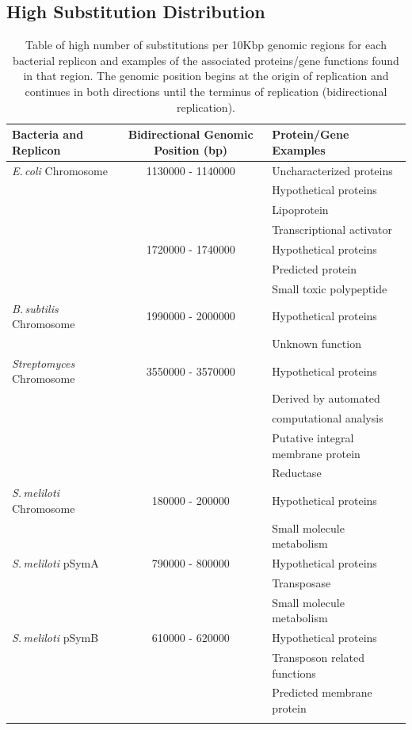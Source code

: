 \documentclass[11pt]{article}
\newcommand{\smel}{\textit{S.\,meliloti}\xspace}
\newcommand{\strep}{\textit{Streptomyces}\xspace}
\newcommand{\ecol}{\textit{E.\,coli}\xspace}
\newcommand{\bass}{\textit{B.\,subtilis}\xspace}
\newcommand{\pa}{pSymA\xspace}
\newcommand{\pb}{pSymB\xspace}
\begin{document}
\subsection{High Substitution Distribution}
\begin{longtable}{lcl}
	\hline
	Bacteria and Replicon & Bidirectional Genomic Position (bp) & Protein/Gene Examples \\ \hline
	\ecol Chromosome & 1130000 - 1140000 & Uncharacterized proteins\\
	& & Hypothetical proteins\\
	& & Lipoprotein\\ 
	& & Transcriptional activator\\ 
	& 1720000 - 1740000 & Hypothetical proteins\\
	& & Predicted protein\\
	& & Small toxic polypeptide\\ \hline
	\bass Chromosome & 1990000 - 2000000 & Hypothetical proteins\\
	& & Unknown function\\ \hline
	\strep Chromosome & 3550000 - 3570000 & Hypothetical proteins\\
	& & Derived by automated\\
	&  & computational analysis\\
	& & Putative integral membrane protein\\
	& & Reductase \\ \hline
	\smel Chromosome & 180000 - 200000 & Hypothetical proteins\\
	& & Small molecule metabolism\\	\hline
	\smel \pa & 790000 - 800000 & Hypothetical proteins\\
	& & Transposase \\
	& & Small molecule metabolism \\ \hline
	\smel \pb & 610000 - 620000 & Hypothetical proteins\\
	& & Transposon related functions\\
	& & Predicted membrane protein\\ \hline
	\caption{\label{tab:high_sub_bars} Table of high number of substitutions per 10Kbp genomic regions for each bacterial replicon and examples of the associated proteins/gene functions found in that region. The genomic position begins at the origin of replication and continues in both directions until the terminus of replication (bidirectional replication).}
\end{longtable}
\end{document}
